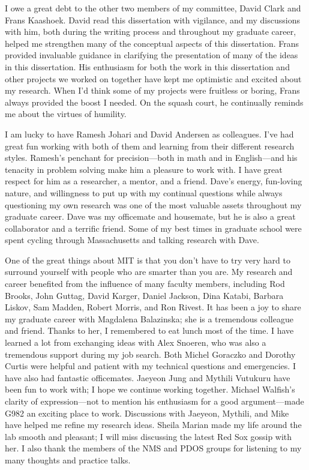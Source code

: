 I owe a great debt to the other two members of my committee, David Clark
and Frans Kaashoek.  David read this dissertation with vigilance, and my
discussions with him, both during the writing process and throughout my
graduate career, helped me strengthen many of the conceptual aspects of
this dissertation.  Frans provided invaluable guidance in clarifying the
presentation of many of the ideas in this dissertation.  His enthusiasm for
both the work in this dissertation and other projects we worked on
together have kept 
me optimistic and excited about my research.  When I'd think
some of my projects were fruitless or boring, Frans 
always provided the boost I needed.  On the squash court, he continually
reminds 
me about the virtues of humility.

I am lucky to have Ramesh Johari and David Andersen as colleagues.  I've
had great fun working with both of them and learning from their
different research styles.  Ramesh's penchant for precision---both in
math and in English---and his tenacity in problem solving make him a
pleasure to work with.  I have great respect for him as
a researcher, a mentor, and a friend.  Dave's energy, fun-loving nature,
and willingness to put up with my continual questions while always
questioning my own research was one of the most
valuable assets throughout my graduate career.  Dave was my officemate
and housemate, but he is also a great collaborator and a terrific
friend.  Some of my best times in graduate school were spent cycling
through Massachusetts and talking research 
with Dave.

One of the great things about MIT is that you don't have to try very
hard to surround yourself with people who are smarter than you are.  My
research and career benefited from the influence of many faculty
members, including Rod Brooks, John Guttag, David Karger, Daniel
Jackson, Dina Katabi, Barbara Liskov, Sam Madden, Robert Morris, and Ron
Rivest.  It
has been a joy to share my graduate career with Magdalena Balazinska;
she is a tremendous colleague and friend. Thanks to her, I remembered
to eat lunch most of the time.  I have learned a lot
from exchanging ideas with Alex Snoeren, who was also a tremendous
support during my job search.
Both Michel  
Goraczko and Dorothy Curtis 
were helpful and patient with my technical questions and
emergencies.  I have also had fantastic officemates.  Jaeyeon Jung and
Mythili Vutukuru have been fun to work with; I hope we continue
working together.  Michael Walfish's clarity of expression---not to
mention his enthusiasm for a good argument---made G982 an exciting place
to work.  Discussions with Jaeyeon, Mythili, and Mike have helped me
refine my research ideas.  Sheila Marian made my life around the lab
smooth and pleasant; I will miss discussing the latest Red Sox gossip
with her.  I also thank the members of the NMS and PDOS groups for
listening to my many thoughts and practice talks.

